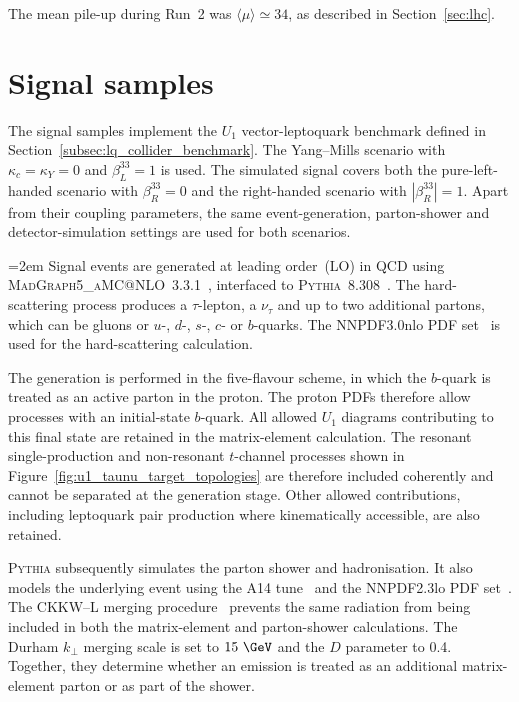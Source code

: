 The mean pile-up during Run~2 was $\langle\mu\rangle\simeq34$, as described in Section~\ref{sec:lhc}.


\section{Signal samples}
\label{sec:signal_samples}

The signal samples implement the $U_{1}$ vector-leptoquark benchmark defined in Section~\ref{subsec:lq_collider_benchmark}. The Yang--Mills scenario with $\kappa_c=\kappa_Y=0$ and $\beta_L^{33}=1$ is used.
The simulated signal covers both the pure-left-handed scenario with $\beta_R^{33}=0$ and the right-handed scenario with $|\beta_R^{33}|=1$.
Apart from their coupling parameters, the same event-generation, parton-shower and detector-simulation settings are used for both scenarios.

\begingroup
\emergencystretch=2em
Signal events are generated at leading order~(LO) in QCD using \textsc{MadGraph5\_\allowbreak aMC@NLO}~3.3.1~\cite{Alwall2014MadGraph}, interfaced to \textsc{Pythia}~8.308~\cite{Bierlich2022Pythia83}.
The hard-scattering process produces a $\tau$-lepton, a $\nu_{\tau}$ and up to two additional partons, which can be gluons or $u$-, $d$-, $s$-, $c$- or $b$-quarks.
The NNPDF3.0nlo PDF set~\cite{Ball2015NNPDF30} is used for the hard-scattering calculation.
\par\endgroup

The generation is performed in the five-flavour scheme, in which the $b$-quark is treated as an active parton in the proton.
The proton PDFs therefore allow processes with an initial-state $b$-quark.
All allowed $U_{1}$ diagrams contributing to this final state are retained in the matrix-element calculation.
The resonant single-production and non-resonant $t$-channel processes shown in Figure~\ref{fig:u1_taunu_target_topologies} are therefore included coherently and cannot be separated at the generation stage.
Other allowed contributions, including leptoquark pair production where kinematically accessible, are also retained.

\textsc{Pythia} subsequently simulates the parton shower and hadronisation.
It also models the underlying event using the A14 tune~\cite{ATLAS2014A14Tune} and the NNPDF2.3lo PDF set~\cite{Ball2013NNPDF23}.
The CKKW--L merging procedure~\cite{Lonnblad2012CKKWL} prevents the same radiation from being included in both the matrix-element and parton-shower calculations.
The Durham $k_{\perp}$ merging scale is set to $15~\GeV$ and the $D$ parameter to 0.4. Together, they determine whether an emission is treated as an additional matrix-element parton or as part of the shower.


